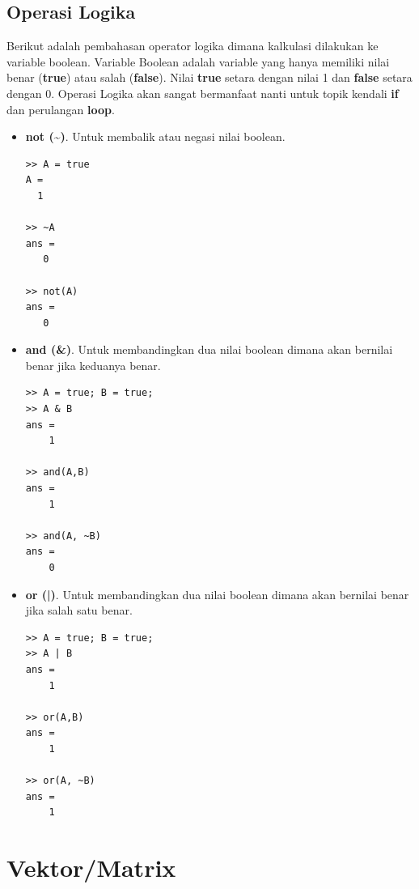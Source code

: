 \documentclass[12pt]{book}
\begin{document}
	\subsection{Operasi Logika}
	
	Berikut adalah pembahasan operator logika dimana kalkulasi dilakukan ke variable boolean.
	Variable Boolean adalah variable yang hanya memiliki nilai benar (\textbf{true}) atau salah (\textbf{false}).
	Nilai \textbf{true} setara dengan nilai 1 dan \textbf{false} setara dengan 0.
	Operasi Logika akan sangat bermanfaat nanti untuk topik kendali \textbf{if} dan perulangan \textbf{loop}.
	
	\begin{itemize}
		\item \textbf{not (\textasciitilde)}. Untuk membalik atau negasi nilai boolean.
		\begin{verbatim}
>> A = true
A =
  1
  
>> ~A
ans =
   0
   
>> not(A)
ans =
   0 
		\end{verbatim}
		
		\newpage
		\item \textbf{and (\&)}. Untuk membandingkan dua nilai boolean dimana akan bernilai benar jika keduanya benar.
		\begin{verbatim}
>> A = true; B = true;
>> A & B
ans = 
    1

>> and(A,B)
ans = 
    1
    
>> and(A, ~B)
ans = 
    0
		\end{verbatim}
		
		\item \textbf{or (|)}. Untuk membandingkan dua nilai boolean dimana akan bernilai benar jika salah satu benar.
		\begin{verbatim}
>> A = true; B = true;
>> A | B
ans = 
    1

>> or(A,B)
ans = 
    1

>> or(A, ~B)
ans = 
    1
		\end{verbatim}
	\end{itemize}

	\section{Vektor/Matrix}
	
\end{document}
